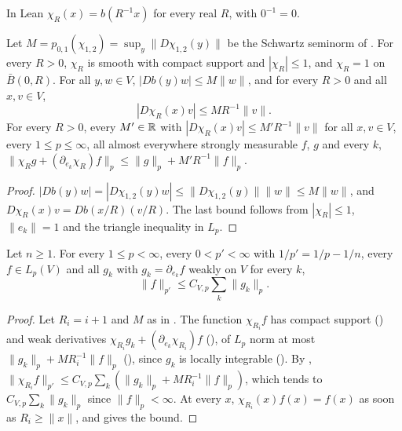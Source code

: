 In Lean $\chi_R(x) = b(R^{-1} x)$ for every real $R$, with $0^{-1} = 0$.

\begin{lemma}
\label{lem:real-cutoff}
\leanok
{}
Let $M = p_{0,1}(\chi_{1,2}) = \sup_y \|D\chi_{1,2}(y)\|$ be the Schwartz seminorm of
. For every $R > 0$, $\chi_R$ is smooth with compact support and
$|\chi_R| \leq 1$, and $\chi_R = 1$ on $\bar B(0, R)$. For all $y, w \in V$,
$|Db(y) w| \leq M \|w\|$, and for every $R > 0$ and all $x, v \in V$,
\[
  |D\chi_R(x) v| \leq M R^{-1} \|v\| .
\]
For every $R > 0$, every $M' \in \mathbb{R}$ with $|D\chi_R(x) v| \leq M' R^{-1} \|v\|$ for all
$x, v \in V$, every $1 \leq p \leq \infty$, all almost everywhere strongly measurable $f$, $g$
and every $k$, $\|\chi_R g + (\partial_{e_k} \chi_R) f\|_p \leq \|g\|_p + M' R^{-1} \|f\|_p$.
\end{lemma}

\begin{proof}
\leanok
$|Db(y) w| = |D\chi_{1,2}(y) w| \leq \|D\chi_{1,2}(y)\| \|w\| \leq M \|w\|$, and
$D\chi_R(x) v = Db(x/R)(v/R)$. The last bound follows from $|\chi_R| \leq 1$, $\|e_k\| = 1$ and
the triangle inequality in $L_p$.
\end{proof}

\begin{theorem}
\label{thm:gns-weak}
\leanok
{}
Let $n \geq 1$. For every $1 \leq p < \infty$, every $0 < p' < \infty$ with
$1/p' = 1/p - 1/n$, every $f \in L_p(V)$ and all $g_k$ with $g_k = \partial_{e_k} f$ weakly on
$V$ for every $k$,
\[
  \|f\|_{p'} \leq C_{V,p} \sum_k \|g_k\|_p .
\]
\end{theorem}

\begin{proof}
\leanok
Let $R_i = i + 1$ and $M$ as in . The function $\chi_{R_i} f$ has compact
support () and weak derivatives
$\chi_{R_i} g_k + (\partial_{e_k} \chi_{R_i}) f$ (), of $L_p$
norm at most $\|g_k\|_p + M R_i^{-1} \|f\|_p$ (), since $g_k$ is locally
integrable (). By ,
$\|\chi_{R_i} f\|_{p'} \leq C_{V,p} \sum_k (\|g_k\|_p + M R_i^{-1} \|f\|_p)$, which tends to
$C_{V,p} \sum_k \|g_k\|_p$ since $\|f\|_p < \infty$. At every $x$, $\chi_{R_i}(x) f(x) = f(x)$
as soon as $R_i \geq \|x\|$, and  gives the bound.
\end{proof}


